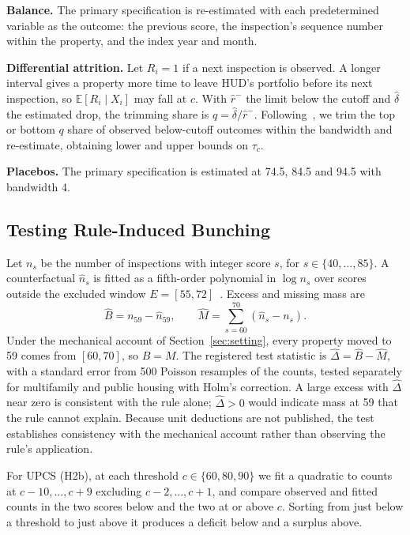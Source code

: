 \documentclass[10pt,twocolumn,letterpaper]{article}
\newcommand{\runhead}[1]{\par\vspace{0.35ex}\noindent\textbf{#1}\hspace{0.35em}}
\begin{document}
\runhead{Balance.} The primary specification is re-estimated with each predetermined variable as the outcome: the previous score, the inspection's sequence number within the property, and the index year and month.

\runhead{Differential attrition.} Let $R_i=1$ if a next inspection is observed. A longer interval gives a property more time to leave HUD's portfolio before its next inspection, so $\mathbb E[R_i\mid X_i]$ may fall at $c$. With $\hat r^-$ the limit below the cutoff and $\hat\delta$ the estimated drop, the trimming share is $q=\hat\delta/\hat r^-$. Following~\cite{lee2009}, we trim the top or bottom $q$ share of observed below-cutoff outcomes within the bandwidth and re-estimate, obtaining lower and upper bounds on $\tau_c$.

\runhead{Placebos.} The primary specification is estimated at 74.5, 84.5 and 94.5 with bandwidth 4.

\subsection{Testing Rule-Induced Bunching}\label{sec:bunchmethod}
Let $n_s$ be the number of inspections with integer score $s$, for $s\in\{40,\dots,85\}$. A counterfactual $\hat n_s$ is fitted as a fifth-order polynomial in $\log n_s$ over scores outside the excluded window $E=[55,72]$~\cite{kleven2016}. Excess and missing mass are
\begin{equation}
\hat B=n_{59}-\hat n_{59},\qquad \hat M=\sum_{s=60}^{70}(\hat n_s-n_s).
\end{equation}
Under the mechanical account of Section~\ref{sec:setting}, every property moved to 59 comes from $[60,70]$, so $B=M$. The registered test statistic is $\hat\Delta=\hat B-\hat M$, with a standard error from 500 Poisson resamples of the counts, tested separately for multifamily and public housing with Holm's correction. A large excess with $\hat\Delta$ near zero is consistent with the rule alone; $\hat\Delta>0$ would indicate mass at 59 that the rule cannot explain. Because unit deductions are not published, the test establishes consistency with the mechanical account rather than observing the rule's application.

For UPCS (H2b), at each threshold $c\in\{60,80,90\}$ we fit a quadratic to counts at $c-10,\dots,c+9$ excluding $c-2,\dots,c+1$, and compare observed and fitted counts in the two scores below and the two at or above $c$. Sorting from just below a threshold to just above it produces a deficit below and a surplus above.
\end{document}
